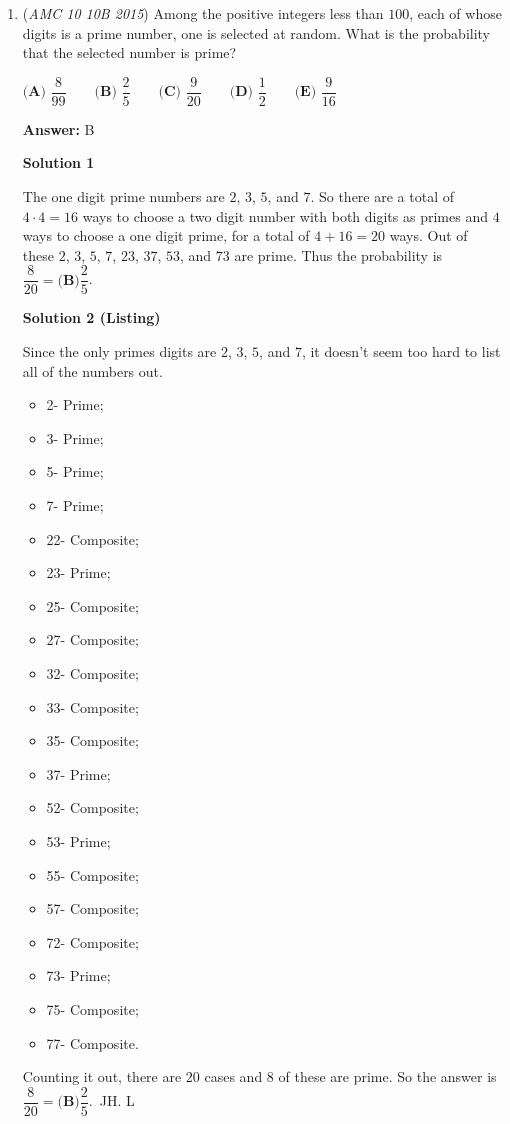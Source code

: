 \begin{enumerate}
	\item (\textit{AMC 10 10B 2015}) Among the positive integers less than $100$, each of whose digits is a prime number, one is selected at random. What is the probability that the selected number is prime?


 $\textbf{(A) } \dfrac{8}{99} \qquad\textbf{(B) } \dfrac{2}{5} \qquad\textbf{(C) } \dfrac{9}{20} \qquad\textbf{(D) } \dfrac{1}{2} \qquad\textbf{(E) } \dfrac{9}{16}$

 \textbf{Answer: }B



\textbf{Solution 1}

The one digit prime numbers are $2$, $3$, $5$, and $7$. So there are a total of $4\cdot4=16$ ways to choose a two digit number with both digits as primes and $4$ ways to choose a one digit prime, for a total of $4+16=20$ ways. Out of these $2$, $3$, $5$, $7$, $23$, $37$, $53$, and $73$ are prime. Thus the probability is $\dfrac{8}{20}=\boxed{\textbf{(B)} \dfrac{2}{5}}$.

 



\textbf{Solution 2 (Listing)}

Since the only primes digits are $2$, $3$, $5$, and $7$, it doesn't seem too hard to list all of the numbers out.

 
            \begin{itemize}
        \item 2- Prime;
        \item 3- Prime;
        \item 5- Prime;
        \item 7- Prime;
        \item 22- Composite;
        \item 23- Prime;
        \item 25- Composite;
        \item 27- Composite;
        \item 32- Composite;
        \item 33- Composite;
        \item 35- Composite;
        \item 37- Prime;
        \item 52- Composite;
        \item 53- Prime;
        \item 55- Composite;
        \item 57- Composite;
        \item 72- Composite;
        \item 73- Prime;
        \item 75- Composite;
        \item 77- Composite.
            \end{itemize}
            Counting it out, there are $20$ cases and $8$ of these are prime. So the answer is $\dfrac{8}{20}=\boxed{\textbf{(B)} \dfrac{2}{5}}$.~JH. L


\end{enumerate}
